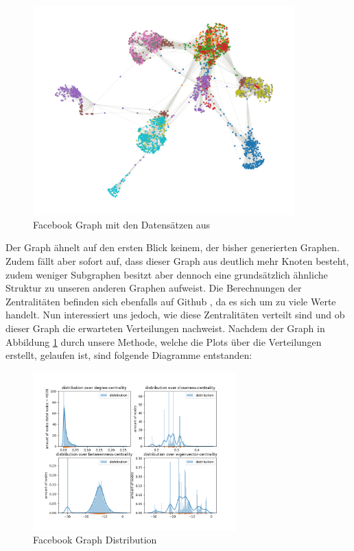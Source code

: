 \FloatBarrier
\begin{figure}[h!]%
  \centering
 \includegraphics[width=0.9\textwidth]{Graphics/FacebookPoliticalPlot.png}
  \caption{Facebook Graph mit den Datensätzen aus \cite{FBData}}
  \label{fig:FacebookGraph}
\end{figure}
\FloatBarrier



Der Graph ähnelt auf den ersten Blick keinem, der bisher generierten Graphen. Zudem fällt aber sofort auf, dass dieser Graph aus deutlich mehr Knoten besteht, zudem weniger Subgraphen besitzt aber dennoch eine grundsätzlich ähnliche Struktur zu unseren anderen Graphen aufweist. Die Berechnungen der Zentralitäten befinden sich ebenfalls auf Github \cite{TZ}, da es sich um zu viele Werte handelt. Nun interessiert uns jedoch, wie diese Zentralitäten verteilt sind und ob dieser Graph die erwarteten Verteilungen nachweist. Nachdem der Graph in Abbildung \ref{fig:FacebookGraph} durch unsere Methode, welche die Plots über die Verteilungen erstellt, gelaufen ist, sind folgende Diagramme entstanden:

\FloatBarrier
\begin{figure}[h!]%
  \centering
\includegraphics[width=0.7\textwidth]{Graphics/facebookLOG.png}
  \caption{Facebook Graph Distribution}
  \label{fig:FacebookGraphDistribution}
\end{figure}
\FloatBarrier

